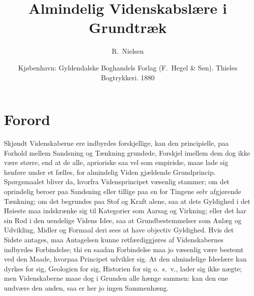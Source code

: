 \documentclass[12pt]{book}
\title{Almindelig Videnskabslære i Grundtræk}
\author{R.\ Nielsen}
\date{Kjøbenhavn: Gyldendalske Boghandels Forlag (F.\ Hegel \& Søn). Thieles Bogtrykkeri. 1880}
\begin{document}
\maketitle
\tableofcontents

\chapter*{Forord}

%
%
%

\noindent Skjøndt Videnskaberne ere indbyrdes forskjellige, kan den
principielle, paa Forhold mellem Sandsning og Tænkning grundede, Forskjel
imellem dem dog ikke være større, end at de alle, aprioriske saa vel som
empiriske, maae lade sig henføre under et fælles, for almindelig Viden
gjældende Grundprincip. Spørgsmaalet bliver da, hvorfra Vidensprincipet
væsenlig stammer; om det oprindelig beroer paa Sandsning eller tillige
paa en for Tingene selv afgjørende Tænkning; om det begrundes paa Stof og
Kraft alene, saa at dets Gyldighed i det Høieste maa indskrænke sig til
Kategorier som Aarsag og Virkning; eller det har sin Rod i den uendelige
Videns Idee, saa at Grundbestemmelser som Anlæg og Udvikling, Midler og
Formaal deri sees at have objectiv Gyldighed. Hvis det Sidste antages,
maa Antagelsen kunne retfærdiggjøres af Videnskabernes indbyrdes
Forbindelse; thi en saadan Forbindelse maa jo væsenlig være bestemt ved
den Maade, hvorpaa Principet udvikler sig. At den almindelige Ideelære
kan dyrkes for sig, Geologien for sig, Historien for sig o.\ s.\ v., lader
sig ikke nægte; men Videnskaberne maae dog i Grunden alle hænge sammen:
kan den ene undvære den anden, saa er her jo ingen Sammenhæng.
\end{document}
